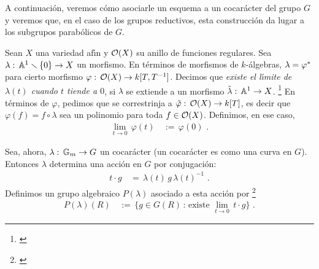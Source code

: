\theoremstyle{plain}
\newtheorem{teoElGrupoDeUnaCurva}{Teorema}[section]
\newtheorem{propoCocaracteresYParabolicosPropios}[teoElGrupoDeUnaCurva]%
	{Proposici\'{o}n}
\newtheorem{teoParabolicoSemidirecto}[teoElGrupoDeUnaCurva]{Proposici\'{o}n}

\theoremstyle{definition}
\newtheorem{defReductivo}[teoElGrupoDeUnaCurva]{Definici\'{o}n}
\newtheorem{ejemploCurvas}[teoElGrupoDeUnaCurva]{Ejemplo}


A continuaci\'{o}n, veremos c\'{o}mo asociarle un esquema a un cocar\'{a}cter
del grupo $G$ y veremos que, en el caso de los grupos reductivos, esta
construcci\'{o}n da lugar a los subgrupos parab\'{o}licos de $G$.

Sean $X$ una variedad af\'{\i}n y $\cal O(X)$ su anillo de funciones regulares.
Sea $\lambda:\,\afin[1]\setmin\{0\}\rightarrow X$ un morfismo. En t\'{e}rminos
de morfismos de $k$-\'{a}lgebras, $\lambda=\pull\varphi$ para cierto morfismo
$\varphi:\,\cal O(X)\rightarrow k[T,T^{-1}]$. Decimos que \emph{existe el %
l\'{\i}mite de $\lambda(t)$ cuando $t$ tiende a $0$}, si $\lambda$ se extiende
a un morfismo $\tilde\lambda:\,\afin[1]\rightarrow X$.%
\footnote{
	\cite[\S~13.b]{MilneAlgebraicGroups}
}
En t\'{e}rminos de $\varphi$, pedimos que se correstrinja a
$\tilde\varphi:\,\cal O(X)\rightarrow k[T]$, es decir que
$\varphi(f)=f\circ\lambda$ sea un polinomio para toda $f\in\cal O(X)$.
Definimos, en ese caso,
\begin{align*}
	\lim_{t\to 0}\,\varphi(t) & \,:=\,\varphi(0)
	\text{ .}
\end{align*}
%

Sea, ahora, $\lambda:\,\multiplicativo\rightarrow G$ un cocar\'{a}cter (un
cocar\'{a}cter es como una curva en $G$). Entonces $\lambda$ determina una
acci\'{o}n en $G$ por conjugaci\'{o}n:
\begin{align*}
	t\cdot g & \,=\,\lambda(t)\,g\,\lambda(t)^{-1}
	\text{ .}
\end{align*}
%
Definimos un grupo algebraico $P(\lambda)$ asociado a esta acci\'{o}n por%
\footnote{
	\cite[Proposition~13.28]{MilneAlgebraicGroups}
}
\begin{align*}
	P(\lambda)(R) & \,:=\,\Big\{g\in G(R)\,:\,\text{existe }
		\lim_{t\to 0}\,t\cdot g\Big\}
	\text{ .}
\end{align*}
%

